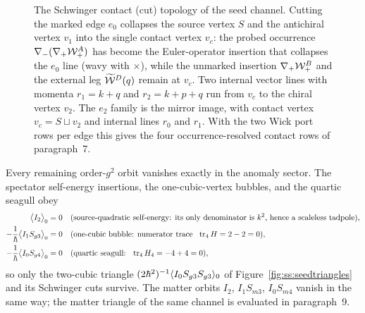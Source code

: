 \begin{figure}[t]
\centering
{}
\caption{The Schwinger contact (cut) topology of the seed channel. Cutting
the marked edge $e_0$ collapses the source vertex $S$ and the antichiral
vertex $v_1$ into the single contact vertex $v_c$: the probed occurrence
$\nabla_{-}(\nabla_{+}\mathcal{W}_{+}^{A})$ has become the Euler-operator insertion
that collapses the $e_0$ line (wavy with $\times$), while the unmarked
insertion $\nabla_{+}\mathcal{W}_{+}^{B}$ and the external leg $\widetilde{\mathcal{W}}^{D}(q)$ remain
at $v_c$. Two internal vector lines with momenta $r_1=k+q$ and $r_2=k+p+q$
run from $v_c$ to the chiral vertex $v_2$. The $e_2$ family is the mirror
image, with contact vertex $v_c=S\sqcup v_2$ and internal lines $r_0$ and
$r_1$. With the two Wick port rows per edge this gives the four
occurrence-resolved contact rows of paragraph~7.}
\label{fig:ss:seedcontact}
\end{figure}

Every remaining order-$g^{2}$ orbit vanishes exactly in the anomaly sector.
The spectator self-energy insertions, the one-cubic-vertex bubbles, and the
quartic seagull obey
\begin{align}
\big\langle I_2\big\rangle_0 &= 0
&&\text{(source-quadratic self-energy: its only denominator is $k^{2}$,
hence a scaleless tadpole),}\notag\\
-\frac{1}{\h}\big\langle I_1S_{g3}\big\rangle_0 &= 0
&&\text{(one-cubic bubble: numerator trace }\ \operatorname{tr}_4 H=2-2=0
\text{),}\label{eq:ss:seedorbits}\\
-\frac{1}{\h}\big\langle I_0S_{g4}\big\rangle_0 &= 0
&&\text{(quartic seagull: }\ \operatorname{tr}_4 H_4=-4+4=0\text{),}\notag
\end{align}
so only the two-cubic triangle
$(2\hbar^{2})^{-1}\langle I_0S_{g3}S_{g3}\rangle_0$ of
Figure~\ref{fig:ss:seedtriangles} and its Schwinger cuts survive. The matter
orbits $I_2$, $I_1S_{m3}$, $I_0S_{m4}$ vanish in the same way; the matter
triangle of the same channel is evaluated in paragraph~9.

